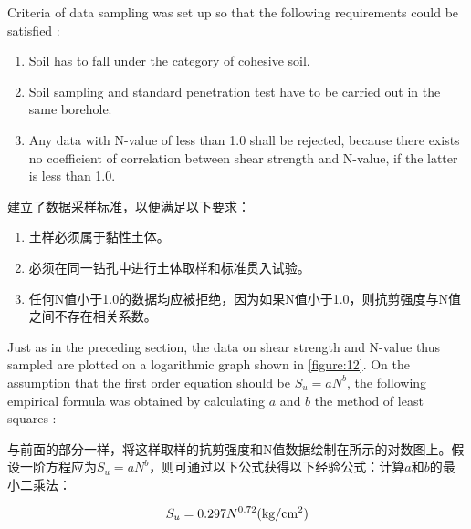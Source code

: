 \begin{paracol}{2}
    
    Criteria of data sampling was set up so that the following requirements could be satisfied :
    \begin{enumerate}
        \item Soil has to fall under the category of cohesive soil.
        \item Soil sampling and standard penetration test have to be carried out in the same borehole.
        \item Any data with N-value of less than 1.0 shall be rejected, because there exists no coefficient of correlation between shear strength and N-value, if the latter is less than 1.0.
    \end{enumerate}
    \switchcolumn

    建立了数据采样标准，以便满足以下要求：
    \begin{enumerate}
        \item 土样必须属于黏性土体。
        \item 必须在同一钻孔中进行土体取样和标准贯入试验。
        \item 任何N值小于1.0的数据均应被拒绝，因为如果N值小于1.0，则抗剪强度与N值之间不存在相关系数。
    \end{enumerate}
    
\end{paracol}


\begin{paracol}{2}
    
    Just as in the preceding section, the data on shear strength and N-value thus sampled are plotted on a logarithmic graph shown in \autoref{figure:12}. On the assumption that the first order equation should be $S_u=aN^b$, the following empirical formula was obtained by calculating $a$ and $b$ the method of least squares :

    \switchcolumn

    与前面的部分一样，将这样取样的抗剪强度和N值数据绘制在所示的对数图上。假设一阶方程应为$S_u=aN^b$，则可通过以下公式获得以下经验公式：计算$a$和$b$的最小二乘法：

\end{paracol}

\begin{align}
    S_u=0.297N^{0.72}(\rm{kg/cm^2})
    \label{equation:11}
\end{align}


